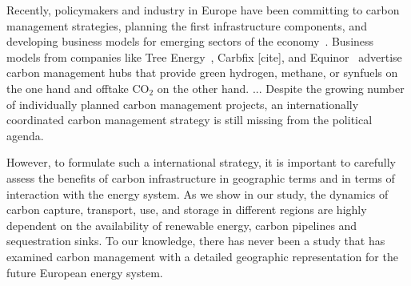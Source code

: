 \documentclass[conference]{IEEEtran}
\begin{document}
Recently, policymakers and industry in Europe have been committing to carbon management strategies, planning the first infrastructure components, and developing business models for emerging sectors of the economy~\cite{adomaitisEquinorRWEBuild2023,apnewswireGermanyDrawLegislation2023,KohlenstoffKannKlimaschutz2023,OGETESJoin2022,TESHydrogenLife2023}. Business models from companies like Tree Energy~\cite{TESHydrogenLife2023}, Carbfix [cite], and Equinor~\cite{adomaitisEquinorRWEBuild2023} advertise carbon management hubs that provide green hydrogen, methane, or synfuels on the one hand and offtake CO$_2$ on the other hand. ...
Despite the growing number of individually planned carbon management projects, an internationally coordinated carbon management strategy is still missing from the political agenda.




However, to formulate such a international strategy, it is important to carefully assess the benefits of carbon infrastructure in geographic terms and in terms of interaction with the energy system. As we show in our study, the dynamics of carbon capture, transport, use, and storage in different regions are highly dependent on the availability of renewable energy, carbon pipelines and sequestration sinks. To our knowledge, there has never been a study that has examined carbon management with a detailed geographic representation for the future European energy system.
\end{document}
